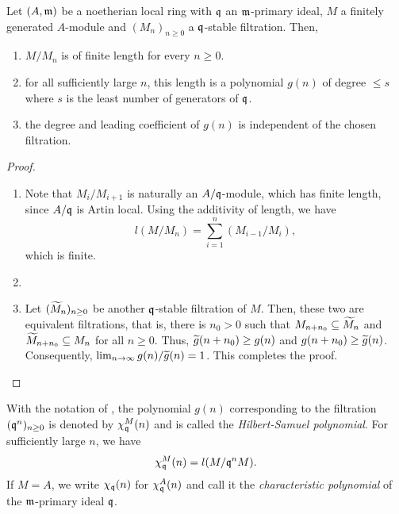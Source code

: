 \begin{proposition}
    Let $(A,\mathfrak m)$ be a noetherian local ring with $\mathfrak q$ an $\mathfrak m$-primary ideal, $M$ a finitely generated $A$-module and $(M_n)_{n\ge 0}$ a $\mathfrak q$-stable filtration. Then, 
    \begin{enumerate}[label=(\alph*)]
        \item $M/M_n$ is of finite length for every $n\ge 0$.
        \item for all sufficiently large $n$, this length is a polynomial $g(n)$ of degree $\le s$ where $s$ is the least number of generators of $\mathfrak q$.
        \item the degree and leading coefficient of $g(n)$ is independent of the chosen filtration.
    \end{enumerate}
\end{proposition}
\begin{proof}
\begin{enumerate}[label=(\alph*)]
    \item Note that $M_i/M_{i + 1}$ is naturally an $A/\mathfrak q$-module, which has finite length, since $A/\mathfrak q$ is Artin local. Using the additivity of length, we have 
    \begin{equation*}
        l(M/M_n) = \sum_{i = 1}^n (M_{i - 1}/M_i),
    \end{equation*}
    which is finite.

    \item 

    \item Let $(\widetilde{M}_n)_{n\ge 0}$ be another $\mathfrak q$-stable filtration of $M$. Then, these two are equivalent filtrations, that is, there is $n_0 > 0$ such that $M_{n + n_0}\subseteq\widetilde{M}_n$ and $\widetilde{M}_{n + n_0}\subseteq M_n$ for all $n\ge0$. Thus, $\widetilde{g}(n + n_0)\ge g(n)$ and $g(n + n_0)\ge\widetilde{g}(n)$. Consequently, $\lim_{n\to\infty} g(n)/\widetilde{g}(n) = 1$. This completes the proof.\qedhere
\end{enumerate}
\end{proof}

\begin{definition}
    With the notation of , the polynomial $g(n)$ corresponding to the filtration $(\mathfrak q^n)_{n\ge 0}$ is denoted by $\chi_\mathfrak q^M(n)$ and is called the \emph{Hilbert-Samuel polynomial}. For sufficiently large $n$, we have 
    \begin{equation*}
        \chi_\mathfrak q^M(n) = l(M/\mathfrak q^n M).
    \end{equation*}
    If $M = A$, we write $\chi_\mathfrak q(n)$ for $\chi_\mathfrak q^A(n)$ and call it the \emph{characteristic polynomial} of the $\mathfrak m$-primary ideal $\mathfrak q$.
\end{definition}


